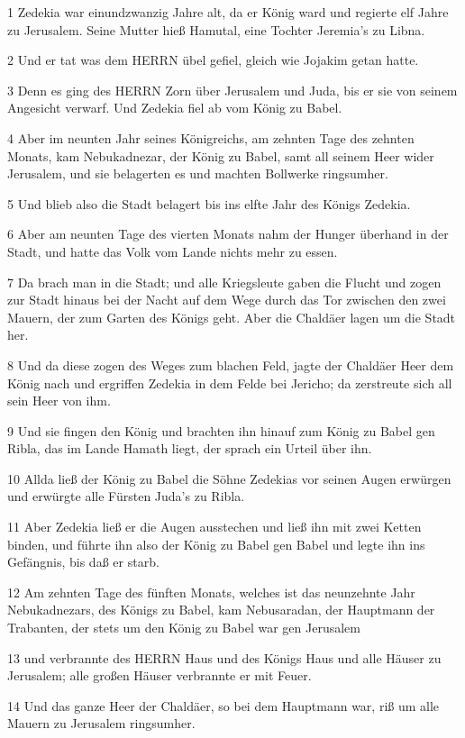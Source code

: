 \par 1 Zedekia war einundzwanzig Jahre alt, da er König ward und regierte elf Jahre zu Jerusalem. Seine Mutter hieß Hamutal, eine Tochter Jeremia's zu Libna.
\par 2 Und er tat was dem HERRN übel gefiel, gleich wie Jojakim getan hatte.
\par 3 Denn es ging des HERRN Zorn über Jerusalem und Juda, bis er sie von seinem Angesicht verwarf. Und Zedekia fiel ab vom König zu Babel.
\par 4 Aber im neunten Jahr seines Königreichs, am zehnten Tage des zehnten Monats, kam Nebukadnezar, der König zu Babel, samt all seinem Heer wider Jerusalem, und sie belagerten es und machten Bollwerke ringsumher.
\par 5 Und blieb also die Stadt belagert bis ins elfte Jahr des Königs Zedekia.
\par 6 Aber am neunten Tage des vierten Monats nahm der Hunger überhand in der Stadt, und hatte das Volk vom Lande nichts mehr zu essen.
\par 7 Da brach man in die Stadt; und alle Kriegsleute gaben die Flucht und zogen zur Stadt hinaus bei der Nacht auf dem Wege durch das Tor zwischen den zwei Mauern, der zum Garten des Königs geht. Aber die Chaldäer lagen um die Stadt her.
\par 8 Und da diese zogen des Weges zum blachen Feld, jagte der Chaldäer Heer dem König nach und ergriffen Zedekia in dem Felde bei Jericho; da zerstreute sich all sein Heer von ihm.
\par 9 Und sie fingen den König und brachten ihn hinauf zum König zu Babel gen Ribla, das im Lande Hamath liegt, der sprach ein Urteil über ihn.
\par 10 Allda ließ der König zu Babel die Söhne Zedekias vor seinen Augen erwürgen und erwürgte alle Fürsten Juda's zu Ribla.
\par 11 Aber Zedekia ließ er die Augen ausstechen und ließ ihn mit zwei Ketten binden, und führte ihn also der König zu Babel gen Babel und legte ihn ins Gefängnis, bis daß er starb.
\par 12 Am zehnten Tage des fünften Monats, welches ist das neunzehnte Jahr Nebukadnezars, des Königs zu Babel, kam Nebusaradan, der Hauptmann der Trabanten, der stets um den König zu Babel war gen Jerusalem
\par 13 und verbrannte des HERRN Haus und des Königs Haus und alle Häuser zu Jerusalem; alle großen Häuser verbrannte er mit Feuer.
\par 14 Und das ganze Heer der Chaldäer, so bei dem Hauptmann war, riß um alle Mauern zu Jerusalem ringsumher.
